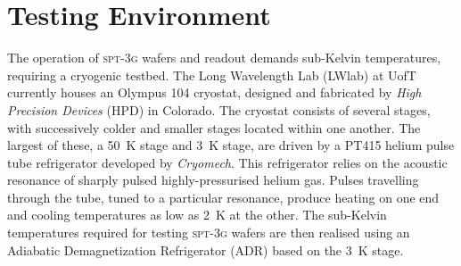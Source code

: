 \documentclass[iop]{emulateapj}
\begin{document}

\section{Testing Environment}
\label{testing_section}

The operation of \textsc{spt-3g} wafers and readout demands sub-Kelvin temperatures, requiring a cryogenic testbed.  The Long Wavelength Lab (LWlab) at UofT currently houses an Olympus 104 cryostat, designed and fabricated by \textit{High Precision Devices} (HPD) in Colorado.  The cryostat consists of several stages, with successively colder and smaller stages located within one another.  The largest of these, a 50~K stage and 3~K stage, are driven by a PT415 helium pulse tube refrigerator developed by \textit{Cryomech}.  This refrigerator relies on the acoustic resonance of sharply pulsed highly-pressurised helium gas.  Pulses travelling through the tube, tuned to a particular resonance, produce heating on one end and cooling temperatures as low as 2~K at the other.  The sub-Kelvin temperatures required for testing \textsc{spt-3g} wafers are then realised using an Adiabatic Demagnetization Refrigerator (ADR) based on the 3~K stage.  
\end{document}
